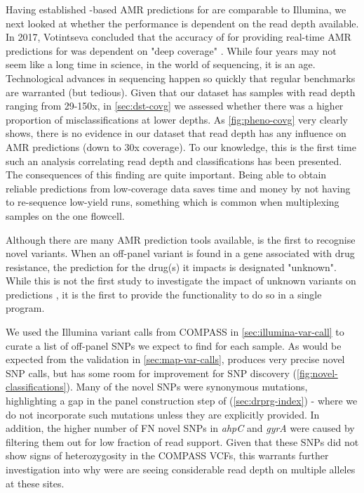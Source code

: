 \noindent
Having established \ont{}-based AMR predictions for \mtb{} are comparable to Illumina, we next looked at whether the \ont{} performance is dependent on the read depth available. In 2017, Votintseva \etal{} concluded that the accuracy of \ont{} for providing real-time AMR predictions for \mtb{} was dependent on "deep coverage" \cite{Votintseva2017}. While four years may not seem like a long time in science, in the world of \ont{} sequencing, it is an age. Technological advances in \ont{} sequencing happen so quickly that regular benchmarks are warranted (but tedious). Given that our dataset has samples with read depth ranging from 29-150x, in \autoref{sec:dst-covg} we assessed whether there was a higher proportion of misclassifications at lower depths. As \autoref{fig:pheno-covg} very clearly shows, there is no evidence in our dataset that read depth has any influence on AMR predictions (down to 30x coverage). To our knowledge, this is the first time such an analysis correlating read depth and classifications has been presented. The consequences of this finding are quite important. Being able to obtain reliable predictions from low-coverage data saves time and money by not having to re-sequence low-yield \ont{} runs, something which is common when multiplexing samples on the one flowcell.

\noindent
Although there are many \mtb{} AMR prediction tools available, \drprg{} is the first to recognise novel variants. When an off-panel variant is found in a gene associated with drug resistance, the prediction for the drug(s) it impacts is designated "unknown". While this is not the first study to investigate the impact of unknown variants on predictions \cite{cryptic2018,hunt2019}, it is the first to provide the functionality to do so in a single program.

We used the Illumina variant calls from COMPASS in \autoref{sec:illumina-var-call} to curate a list of off-panel SNPs we expect to find for each sample. As would be expected from the \pandora{} validation in \autoref{sec:map-var-calls}, \drprg{} produces very precise novel SNP calls, but has some room for improvement for SNP discovery (\autoref{fig:novel-classifications}). Many of the novel SNPs were synonymous mutations, highlighting a gap in the panel construction step of \drprg{} (\autoref{sec:drprg-index}) - where we do not incorporate such mutations unless they are explicitly provided. In addition, the higher number of FN novel SNPs in \textit{ahpC} and \textit{gyrA} were caused by \drprg{} filtering them out for low fraction of read support. Given that these SNPs did not show signs of heterozygosity in the COMPASS VCFs, this warrants further investigation into why were are seeing considerable read depth on multiple alleles at these sites.


